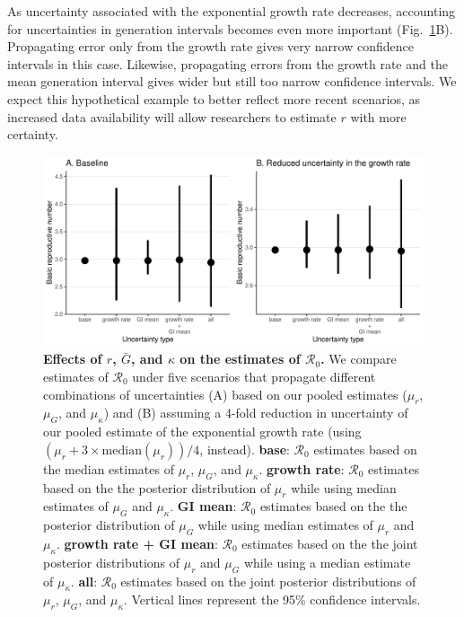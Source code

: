 \documentclass[12pt]{article}
\newcommand{\fref}[1]{Fig.~\ref{fig:#1}}
\newcommand{\Ro}{\ensuremath{{\mathcal R}_{0}}\xspace}
\begin{document}
As uncertainty associated with the exponential growth rate decreases, accounting for uncertainties in generation intervals becomes even more important (\fref{eff}B).
Propagating error only from the growth rate gives very narrow confidence intervals in this case. 
Likewise, propagating errors from the growth rate and the mean generation interval gives wider but still too narrow confidence intervals.
We expect this hypothetical example to better reflect more recent scenarios, as increased data availability will allow researchers to estimate $r$ with more certainty.

\begin{figure}[!ht]
\includegraphics[width=\textwidth]{figure2.pdf}
\caption{
  \textbf{Effects of $r$, $\bar G$, and $\kappa$ on the estimates of \Ro.}
We compare estimates of \Ro under five scenarios that propagate different combinations of uncertainties (A) based on our pooled estimates ($\mu_r$, $\mu_G$, and $\mu_\kappa$) and (B) assuming a 4-fold reduction in uncertainty of our pooled estimate of the exponential growth rate (using $(\mu_r + 3\times\mathrm{median}(\mu_r))/4$, instead).
\textbf{base}: \Ro estimates based on the median estimates of $\mu_r$, $\mu_G$, and $\mu_\kappa$.
\textbf{growth rate}: \Ro estimates based on the the posterior distribution of $\mu_r$ while using median estimates of $\mu_G$ and $\mu_\kappa$.
\textbf{GI mean}: \Ro estimates based on the the posterior distribution of $\mu_G$ while using median estimates of $\mu_r$ and $\mu_\kappa$.
\textbf{growth rate + GI mean}: \Ro estimates based on the the joint posterior distributions of $\mu_r$ and $\mu_G$ while using a median estimate of $\mu_\kappa$.
\textbf{all}: \Ro estimates based on the joint posterior distributions of  $\mu_r$, $\mu_G$, and $\mu_\kappa$.
Vertical lines represent the 95\% confidence intervals.
}
\label{fig:eff}
\end{figure}
\end{document}
